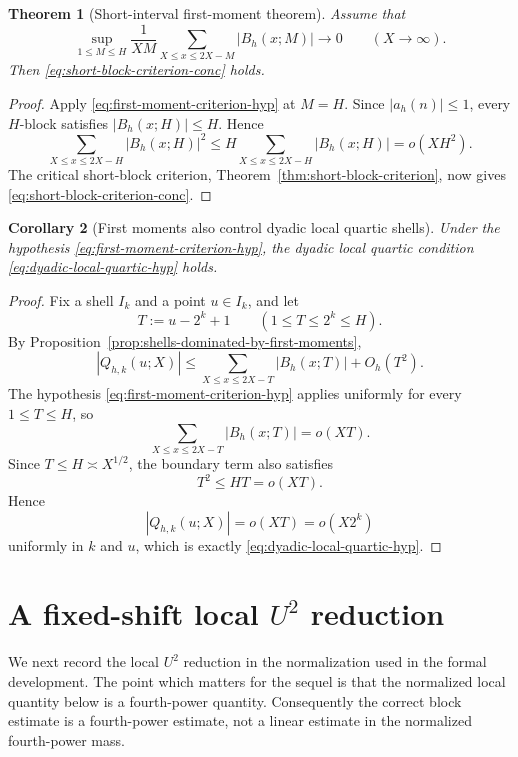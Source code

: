 \documentclass[11pt]{scrartcl}
\numberwithin{equation}{section}
\newtheorem{theorem}{Theorem}[section]
\newtheorem{corollary}[theorem]{Corollary}
\theoremstyle{definition}
\newcommand{\1}{\mathbf 1}
\newcommand{\abs}[1]{\left|#1\right|}
\begin{document}
\begin{theorem}[Short-interval first-moment theorem]
\label{thm:first-moment-criterion}
Assume that
\begin{equation}
\label{eq:first-moment-criterion-hyp}
\sup_{1\le M\le H}
\frac{1}{XM}
\sum_{X\le x\le 2X-M}\abs{B_h(x;M)}\to 0
\qquad (X\to\infty).
\end{equation}
Then \eqref{eq:short-block-criterion-conc} holds.
\end{theorem}

\begin{proof}
Apply \eqref{eq:first-moment-criterion-hyp} at $M=H$. Since $\abs{a_h(n)}\le 1$, every $H$-block satisfies $\abs{B_h(x;H)}\le H$. Hence
\[
\sum_{X\le x\le 2X-H}\abs{B_h(x;H)}^2
\le
H\sum_{X\le x\le 2X-H}\abs{B_h(x;H)}=o(XH^2).
\]
The critical short-block criterion, Theorem~\ref{thm:short-block-criterion}, now gives \eqref{eq:short-block-criterion-conc}.
\end{proof}

\begin{corollary}[First moments also control dyadic local quartic shells]
\label{cor:first-moment-dyadic-shells}
Under the hypothesis \eqref{eq:first-moment-criterion-hyp}, the dyadic local quartic condition \eqref{eq:dyadic-local-quartic-hyp} holds.
\end{corollary}

\begin{proof}
Fix a shell $I_k$ and a point $u\in I_k$, and let
\[
T:=u-2^k+1
\qquad (1\le T\le 2^k\le H).
\]
By Proposition~\ref{prop:shells-dominated-by-first-moments},
\[
\abs{Q_{h,k}(u;X)}
\le
\sum_{X\le x\le 2X-T}\abs{B_h(x;T)}+O_h(T^2).
\]
The hypothesis \eqref{eq:first-moment-criterion-hyp} applies uniformly for every $1\le T\le H$, so
\[
\sum_{X\le x\le 2X-T}\abs{B_h(x;T)}=o(XT).
\]
Since $T\le H\asymp X^{1/2}$, the boundary term also satisfies
\[
T^2\le HT=o(XT).
\]
Hence
\[
\abs{Q_{h,k}(u;X)}=o(XT)=o(X2^k)
\]
uniformly in $k$ and $u$, which is exactly \eqref{eq:dyadic-local-quartic-hyp}.
\end{proof}

\section{A fixed-shift local \texorpdfstring{$U^2$}{U2} reduction}
\label{sec:local-u2}

We next record the local $U^2$ reduction in the normalization used in the formal development. The point which matters for the sequel is that the normalized local quantity below is a fourth-power quantity. Consequently the correct block estimate is a fourth-power estimate, not a linear estimate in the normalized fourth-power mass.
\end{document}
